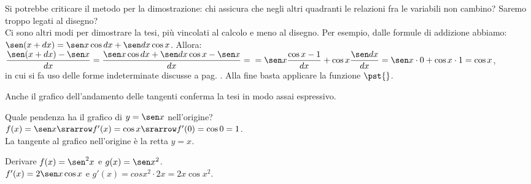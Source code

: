 \begin{osservazione}
  Si potrebbe criticare il metodo per la dimostrazione: chi assicura che negli
  altri quadranti le relazioni fra le variabili non cambino? Saremo troppo
  legati al disegno?\\
  Ci sono altri modi per dimostrare la tesi, più vincolati al calcolo
  e meno al disegno.  Per esempio, dalle formule di addizione abbiamo:
  $\sen(x+dx)=\sen x \cos dx + \sen dx \cos x$. Allora:\\
  $\dfrac{\sen(x+dx)-\sen x}{dx}=\dfrac{\sen x \cos dx + \sen dx \cos x -
   \sen x}{dx}=\\
  =\sen x \dfrac{\cos x-1}{dx}+ \cos x\dfrac{\sen dx}{dx}=
  \sen x\cdot 0 + \cos x\cdot 1=\cos x$,\\
  in cui si fa uso delle forme indeterminate discusse a pag. 
  \pageref{subsubsec:insnum_fseno}. Alla fine basta applicare la funzione 
  $\pst{}$.
\end{osservazione}

\begin{osservazione}
Anche il grafico dell'andamento delle tangenti conferma la tesi
in modo assai espressivo. \\
\begin{inaccessibleblock}
  \begin{minipage}[]{.47\textwidth}
    \begin{center} \seno \end{center}
 \end{minipage} 
  \hfill
 \begin{minipage}[]{.47\textwidth}
 \begin{center} \tangentiseno \end{center}
 \end{minipage}
\end{inaccessibleblock}
\label{}
\end{osservazione}

\begin{esempio}
Quale pendenza ha il grafico di $y=\sen x$ nell'origine?\\
$f(x)= \sen x \srarrow f'(x)=\cos x\srarrow f'(0)=\cos 0=1$.\\
La tangente al grafico nell'origine è la retta $y=x$.
\end{esempio}

\begin{esempio}
Derivare $f(x)=\sen^2 x$ e $g(x)= \sen x^2$.\\
$f'(x)=2\sen x \cos x$ e $g'(x)=cos x^2\cdot 2x= 2x \cos x^2$.
\end{esempio}

